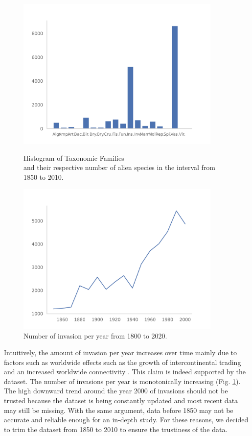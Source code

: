 \documentclass[mscthesis]{usiinfthesis}
\begin{document}
\begin{figure}[H]
\centering
\begin{minipage}{.55\textwidth}
    \centering
    \includegraphics[width=0.9\textwidth]{histogram_taxfam}
    \caption{Histogram of Taxonomic Families \\ and their respective number of alien species in the interval from 1850 to 2010.}
    \label{fig:hist_tax_fam}
\end{minipage}%
\begin{minipage}{.55\textwidth}
    \centering
    \includegraphics[width=0.9\textwidth]{invasion_per_year.png}
    \caption{Number of invasion per year from 1800 to 2020.}
    \label{fig:invasion_per_year}
\end{minipage}
\end{figure}

Intuitively, the amount of invasion per year increases over time mainly due to factors such as worldwide effects such as the growth of intercontinental trading and an increased worldwide connectivity \cite{intro:ecological}. This claim is indeed supported by the dataset. The number of invasions per year is monotonically increasing (Fig. \ref{fig:invasion_per_year}). The high downward trend around the year 2000 of invasions should not be trusted because the dataset is being constantly updated and most recent data may still be missing. With the same argument, data before 1850 may not be accurate and reliable enough for an in-depth study. For these reasons, we decided to trim the dataset from 1850 to 2010 to ensure the trustiness of the data. 
\end{document}
